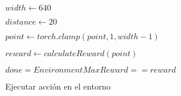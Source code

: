 \vspace{3ex}
\begin{algorithm}[H]
	\label{environment-step-action}
	\SetAlgoLined
	\medskip
	$width \gets 640$

	$distance \gets 20$

	$point \gets torch.clamp(point, 1, width-1)$

	$reward \gets calculateReward(point)$

	$done = EnvironmentMaxReward == reward$

	\caption{Ejecutar acción en el entorno}
\end{algorithm}
\vspace{3ex}